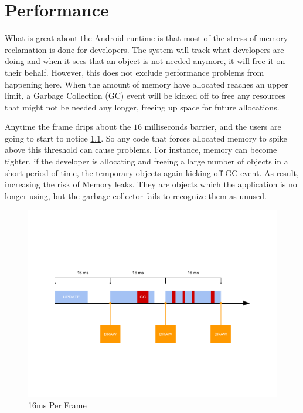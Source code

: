 \label{chapter-performance}
\chapter{Performance}

What is great about the Android runtime is that most of the stress of memory reclamation is done for developers. The system will track what developers are doing and when it sees that an object is not needed anymore, it will free it on their behalf. However, this does not exclude performance problems from happening here. When the amount of memory have allocated reaches an upper limit, a Garbage Collection (GC) event will be kicked off to free any resources that might not be needed any longer, freeing up space for future allocations. 

Anytime the frame drips about the $16$ milliseconds barrier, and the users are going to start to notice \ref{fig:16ms-per-frame}. So any code that forces allocated memory to spike above this threshold can cause problems. For instance, memory can become tighter, if the developer is allocating and freeing a large number of objects in a short period of time, the temporary objects again kicking off GC event. As result, increasing the risk of Memory leaks. They are objects which the application is no longer using, but the garbage collector fails to recognize them as unused.

\begin{figure}[H]
	\caption{16ms Per Frame}
	\label{fig:16ms-per-frame}
	\centering
	\includegraphics[width=\linewidth]{Figures/16ms-per-frame.png}
	\decoRule
\end{figure}

